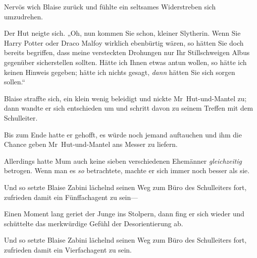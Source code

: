 Nervös wich Blaise zurück und fühlte ein seltsames Widerstreben sich umzudrehen.

Der Hut neigte sich. „Oh, nun kommen Sie schon, kleiner Slytherin. Wenn Sie Harry Potter oder Draco Malfoy wirklich ebenbürtig wären, so hätten Sie doch bereits begriffen, dass meine versteckten Drohungen nur Ihr Stillschweigen Albus gegenüber sicherstellen sollten. Hätte ich Ihnen etwas antun wollen, so hätte ich keinen Hinweis gegeben; hätte ich nichts gesagt, \emph{dann} hätten Sie sich sorgen sollen.“

Blaise straffte sich, ein klein wenig beleidigt und nickte Mr~Hut-und-Mantel zu; dann wandte er sich entschieden um und schritt davon zu seinem Treffen mit dem Schulleiter.

Bis zum Ende hatte er gehofft, es würde noch jemand auftauchen und ihm die Chance geben Mr~Hut-und-Mantel ans Messer zu liefern.

Allerdings hatte Mum auch keine sieben verschiedenen Ehemänner \emph{gleichzeitig} betrogen. Wenn man es \emph{so} betrachtete, machte er sich immer noch besser als sie.

Und so setzte Blaise Zabini lächelnd seinen Weg zum Büro des Schulleiters fort, zufrieden damit ein Fünffachagent zu sein—

Einen Moment lang geriet der Junge ins Stolpern, dann fing er sich wieder und schüttelte das merkwürdige Gefühl der Desorientierung ab.

Und so setzte Blaise Zabini lächelnd seinen Weg zum Büro des Schulleiters fort, zufrieden damit ein Vierfachagent zu sein.

